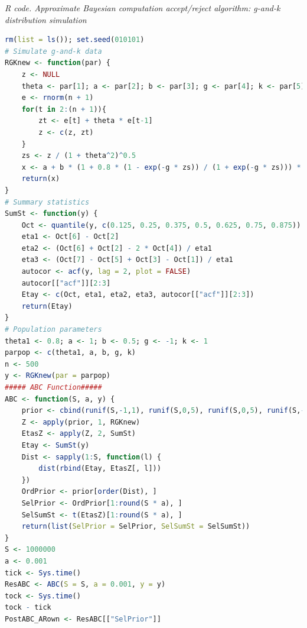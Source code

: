 \begin{enumerate}[leftmargin=*]
\begin{tcolorbox}[enhanced,width=4.67in,center upper,
	fontupper=\large\bfseries,drop shadow southwest,sharp corners]
	\textit{R code. Approximate Bayesian computation accept/reject algorithm: g-and-k distribution simulation}
	\begin{VF}
		\begin{lstlisting}[language=R]
rm(list = ls()); set.seed(010101)
# Simulate g-and-k data
RGKnew <- function(par) {
	z <- NULL
	theta <- par[1]; a <- par[2]; b <- par[3]; g <- par[4]; k <- par[5]
	e <- rnorm(n + 1)
	for(t in 2:(n + 1)){
		zt <- e[t] + theta * e[t-1]
		z <- c(z, zt)
	}
	zs <- z / (1 + theta^2)^0.5
	x <- a + b * (1 + 0.8 * (1 - exp(-g * zs)) / (1 + exp(-g * zs))) * (1 + zs^2)^k * zs
	return(x)
}
# Summary statistics
SumSt <- function(y) {
	Oct <- quantile(y, c(0.125, 0.25, 0.375, 0.5, 0.625, 0.75, 0.875))
	eta1 <- Oct[6] - Oct[2]
	eta2 <- (Oct[6] + Oct[2] - 2 * Oct[4]) / eta1
	eta3 <- (Oct[7] - Oct[5] + Oct[3] - Oct[1]) / eta1
	autocor <- acf(y, lag = 2, plot = FALSE)
	autocor[["acf"]][2:3]
	Etay <- c(Oct, eta1, eta2, eta3, autocor[["acf"]][2:3])
	return(Etay)
}
# Population parameters
theta1 <- 0.8; a <- 1; b <- 0.5; g <- -1; k <- 1
parpop <- c(theta1, a, b, g, k)
n <- 500
y <- RGKnew(par = parpop) 
##### ABC Function#####
ABC <- function(S, a, y) {
	prior <- cbind(runif(S,-1,1), runif(S,0,5), runif(S,0,5), runif(S,-5,5), runif(S,-0.5,5))
	Z <- apply(prior, 1, RGKnew)
	EtasZ <- apply(Z, 2, SumSt)
	Etay <- SumSt(y) 
	Dist <- sapply(1:S, function(l) {
		dist(rbind(Etay, EtasZ[, l]))
	})
	OrdPrior <- prior[order(Dist), ]
	SelPrior <- OrdPrior[1:round(S * a), ]
	SelSumSt <- t(EtasZ)[1:round(S * a), ]
	return(list(SelPrior = SelPrior, SelSumSt = SelSumSt))
}
S <- 1000000
a <- 0.001
tick <- Sys.time()
ResABC <- ABC(S = S, a = 0.001, y = y)
tock <- Sys.time()
tock - tick
PostABC_ARown <- ResABC[["SelPrior"]]
\end{lstlisting}
	\end{VF}
\end{tcolorbox}


\end{enumerate}
